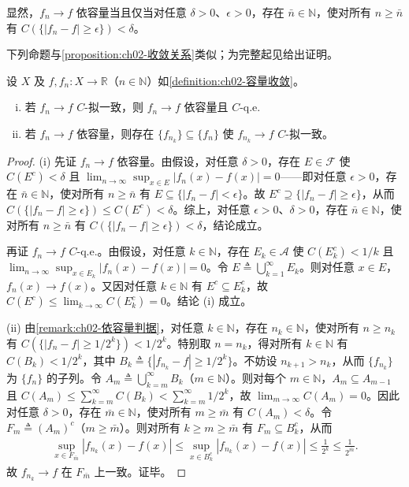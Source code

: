 \documentclass[../../main.tex]{subfiles}%
\begin{document}
\begin{remark}\label{remark:ch02-依容量判据}
显然，$f_n\to f$ 依容量当且仅当对任意 $\delta>0$、$\epsilon>0$，存在 $\bar n\in\mathbb N$，使对所有 $n\geqslant\bar n$ 有 $C(\{|f_n-f|\geqslant\epsilon\})<\delta$。
\end{remark}

下列命题与\cref{proposition:ch02-收敛关系}类似；为完整起见给出证明。

\begin{proposition}\label{proposition:ch02-容量收敛关系}
设 $X$ 及 $f,f_n:X\to\mathbb R$（$n\in\mathbb N$）如\cref{definition:ch02-容量收敛}。
\begin{enumerate}[(i)]
\item 若 $f_n\to f$ $C$-拟一致，则 $f_n\to f$ 依容量且 $C$-q.e.
\item 若 $f_n\to f$ 依容量，则存在 $\{f_{n_k}\}\subseteq\{f_n\}$ 使 $f_{n_k}\to f$ $C$-拟一致。
\end{enumerate}
\end{proposition}

\begin{proof}
(i) 先证 $f_n\to f$ 依容量。由假设，对任意 $\delta>0$，存在 $E\in\mathscr F$ 使 $C(E^c)<\delta$ 且 $\lim_{n\to\infty}\sup_{x\in E}|f_n(x)-f(x)|=0$——即对任意 $\epsilon>0$，存在 $\bar n\in\mathbb N$，使对所有 $n\geqslant\bar n$ 有 $E\subseteq\{|f_n-f|<\epsilon\}$。故 $E^c\supseteq\{|f_n-f|\geqslant\epsilon\}$，从而 $C(\{|f_n-f|\geqslant\epsilon\})\leqslant C(E^c)<\delta$。综上，对任意 $\epsilon>0$、$\delta>0$，存在 $\bar n\in\mathbb N$，使对所有 $n\geqslant\bar n$ 有 $C(\{|f_n-f|\geqslant\epsilon\})<\delta$，结论成立。

再证 $f_n\to f$ $C$-q.e.。由假设，对任意 $k\in\mathbb N$，存在 $E_k\in\mathscr A$ 使 $C(E_k^c)<1/k$ 且 $\lim_{n\to\infty}\sup_{x\in E_k}|f_n(x)-f(x)|=0$。令 $E\triangleq \bigcup_{k=1}^\infty E_k$。则对任意 $x\in E$，$f_n(x)\to f(x)$。又因对任意 $k\in\mathbb N$ 有 $E^c\subseteq E_k^c$，故 $C(E^c)\leqslant\lim_{k\to\infty}C(E_k^c)=0$。结论 (i) 成立。

(ii) 由\cref{remark:ch02-依容量判据}，对任意 $k\in\mathbb N$，存在 $n_k\in\mathbb N$，使对所有 $n\geqslant n_k$ 有 $C(\{|f_n-f|\geqslant 1/2^k\})<1/2^k$。特别取 $n=n_k$，得对所有 $k\in\mathbb N$ 有 $C(B_k)<1/2^k$，其中 $B_k\triangleq \{|f_{n_k}-f|\geqslant 1/2^k\}$。不妨设 $n_{k+1}>n_k$，从而 $\{f_{n_k}\}$ 为 $\{f_n\}$ 的子列。令 $A_m\triangleq \bigcup_{k=m}^\infty B_k$（$m\in\mathbb N$）。则对每个 $m\in\mathbb N$，$A_m\subseteq A_{m-1}$ 且 $C(A_m)\leqslant\sum_{k=m}^\infty C(B_k)<\sum_{k=m}^\infty 1/2^k$，故 $\lim_{m\to\infty}C(A_m)=0$。因此对任意 $\delta>0$，存在 $\bar m\in\mathbb N$，使对所有 $m\geqslant\bar m$ 有 $C(A_m)<\delta$。令 $F_m\triangleq (A_m)^c$（$m\geqslant\bar m$）。则对所有 $k\geqslant m\geqslant\bar m$ 有 $F_m\subseteq B_k^c$，从而
\begin{align*}
\sup_{x\in F_{\bar m}}|f_{n_k}(x)-f(x)|\leqslant\sup_{x\in B_k^c}|f_{n_k}(x)-f(x)|\leqslant\frac1{2^k}\leqslant\frac1{2^{\bar m}}.
\end{align*}
故 $f_{n_k}\to f$ 在 $F_{\bar m}$ 上一致。证毕。
\end{proof}
\end{document}
